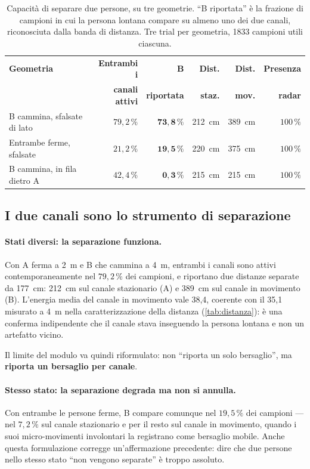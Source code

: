 \begin{table}[htbp]
\centering
\caption{Capacità di separare due persone, su tre geometrie. ``B riportata'' è la
frazione di campioni in cui la persona lontana compare su almeno uno dei due canali,
riconosciuta dalla banda di distanza. Tre trial per geometria, 1833 campioni utili
ciascuna.}
\label{tab:due-persone}
\small
\begin{tabular}{@{}lrrrrr@{}}
\toprule
\textbf{Geometria} & \textbf{Entrambi i} & \textbf{B} & \textbf{Dist.} &
\textbf{Dist.} & \textbf{Presenza} \\
 & \textbf{canali attivi} & \textbf{riportata} & \textbf{staz.} & \textbf{mov.} &
\textbf{radar} \\
\midrule
B cammina, sfalsate di lato & $79{,}2\,\%$ & $\mathbf{73{,}8\,\%}$ & 212~cm & 389~cm & $100\,\%$ \\
Entrambe ferme, sfalsate    & $21{,}2\,\%$ & $\mathbf{19{,}5\,\%}$ & 220~cm & 375~cm & $100\,\%$ \\
B cammina, in fila dietro A & $42{,}4\,\%$ & $\mathbf{0{,}3\,\%}$  & 215~cm & 215~cm & $100\,\%$ \\
\bottomrule
\end{tabular}
\end{table}

\subsection{I due canali sono lo strumento di separazione}

\paragraph{Stati diversi: la separazione funziona.} Con A ferma a 2~m e B che cammina
a 4~m, entrambi i canali sono attivi contemporaneamente nel $79{,}2\,\%$ dei campioni,
e riportano due distanze separate da 177~cm: 212~cm sul canale stazionario (A) e
389~cm sul canale in movimento (B). L'energia media del canale in movimento vale 38,4,
coerente con il 35,1 misurato a 4~m nella caratterizzazione della distanza
(\cref{tab:distanza}): è una conferma indipendente che il canale stava inseguendo la
persona lontana e non un artefatto vicino.

Il limite del modulo va quindi riformulato: non ``riporta un solo bersaglio'', ma
\textbf{riporta un bersaglio per canale}.

\paragraph{Stesso stato: la separazione degrada ma non si annulla.} Con entrambe le
persone ferme, B compare comunque nel $19{,}5\,\%$ dei campioni --- nel $7{,}2\,\%$
sul canale stazionario e per il resto sul canale in movimento, quando i suoi
micro-movimenti involontari la registrano come bersaglio mobile. Anche questa
formulazione corregge un'affermazione precedente: dire che due persone nello stesso
stato ``non vengono separate'' è troppo assoluto.

